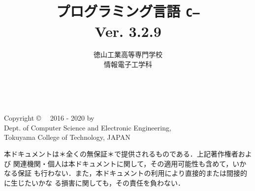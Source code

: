 \documentclass[11pt,a4j,twoside,dvipdfmx]{jbook}
\newcommand{\ver}{Ver. 3.2.9}
\newcommand{\cmm}{{\tt C--}}
\begin{document}
\setlength{\oddsidemargin}{10pt}
\setlength{\evensidemargin}{-10pt}
\setlength{\headsep}{1cm}
\frontmatter

\title{プログラミング言語 \cmm \\\ver}
\author{徳山工業高等専門学校\\情報電子工学科}
\date{}

\maketitle

\thispagestyle{empty}
~
\vfill
\begin{flushleft}
Copyright \copyright ~~ 2016 - 2020 by \\
Dept. of Computer Science and Electronic Engineering, \\
Tokuyama College of Technology, JAPAN
\end{flushleft}

\vspace{0.8cm}

本ドキュメントは＊全くの無保証＊で提供されるものである．上記著作権者および
関連機関・個人は本ドキュメントに関して，その適用可能性も含めて，いかなる保証
も行わない．また，本ドキュメントの利用により直接的または間接的に生じたいかな
る損害に関しても，その責任を負わない．
\setcounter{page}{0}

\tableofcontents

\mainmatter

\appendix

\backmatter
\pagestyle{empty}
\onecolumn
~
\end{document}

